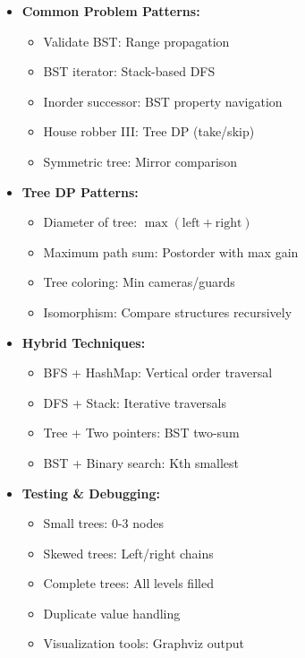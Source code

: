 \documentclass[a4paper,10pt]{book}
\begin{document}
\begin{itemize}
    \item \textbf{Common Problem Patterns:}
    \begin{itemize}
        \item Validate BST: Range propagation
        \item BST iterator: Stack-based DFS
        \item Inorder successor: BST property navigation
        \item House robber III: Tree DP (take/skip)
        \item Symmetric tree: Mirror comparison
    \end{itemize}
    
    \item \textbf{Tree DP Patterns:}
    \begin{itemize}
        \item Diameter of tree: $\max(\text{left}+\text{right})$
        \item Maximum path sum: Postorder with max gain
        \item Tree coloring: Min cameras/guards
        \item Isomorphism: Compare structures recursively
    \end{itemize}
    
    \item \textbf{Hybrid Techniques:}
    \begin{itemize}
        \item BFS + HashMap: Vertical order traversal
        \item DFS + Stack: Iterative traversals
        \item Tree + Two pointers: BST two-sum
        \item BST + Binary search: Kth smallest
    \end{itemize}
    
    \item \textbf{Testing \& Debugging:}
    \begin{itemize}
        \item Small trees: 0-3 nodes
        \item Skewed trees: Left/right chains
        \item Complete trees: All levels filled
        \item Duplicate value handling
        \item Visualization tools: Graphviz output
    \end{itemize}
\end{itemize}
\end{document}
